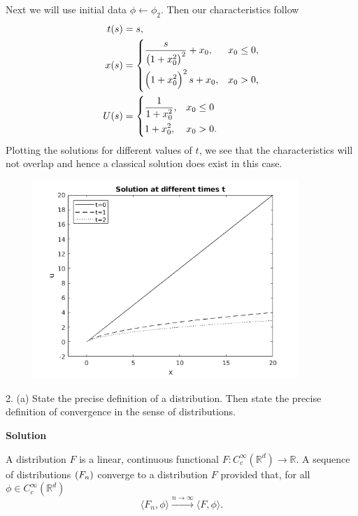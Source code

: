\documentclass{article}
\begin{document}
Next we will use initial data $\phi \gets \phi_2$. Then our
characteristics follow
%
\begin{align*}
    t(s) &= s, \\
    x(s) &=
        \begin{dcases}
            \frac{s}{\del{1 + x_0^2}^2} + x_0, & x_0 \leq 0, \\
            \del{1 + x_0^2}^2 s + x_0, & x_0 > 0,
        \end{dcases} \\
    U(s) &=
        \begin{dcases}
            \frac{1}{1 + x_0^2}, & x_0 \leq 0 \\
            1 + x_0^2, & x_0 > 0.
        \end{dcases}
\end{align*}
%
Plotting the solutions for different values of $t$, we see that the
characteristics will not overlap and hence a classical solution does
exist in this case.

\begin{figure}[H]
    \centering
    \includegraphics[width=10cm]{q1b2}
\end{figure}

\newpage

2. (a) State the precise definition of a distribution. Then state the
precise definition of convergence in the sense of distributions.

\textbf{Solution}

A distribution $F$ is a linear, continuous functional $F:
C_c^\infty(\mathbb{R}^d) \to \mathbb{R}$. A sequence of distributions
$\del{F_n}$ converge to a distribution $F$ provided that, for all $\phi
\in C_c^\infty(\mathbb{R}^d)$
%
\begin{equation*}
    \langle F_n, \phi \rangle \xrightarrow{n \to \infty} \langle F, \phi \rangle
    .
\end{equation*}
\end{document}
